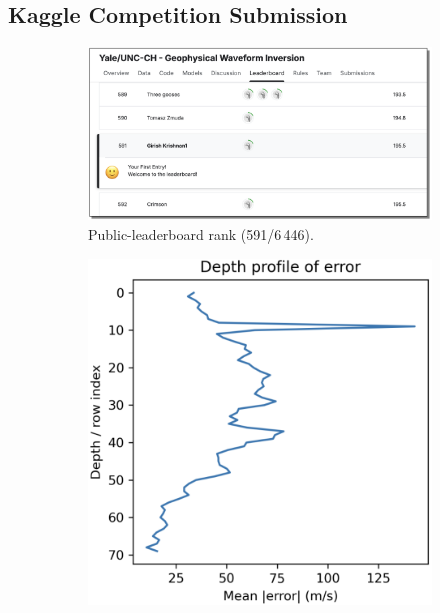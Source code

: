 \documentclass{article}
\begin{document}
\subsection{Kaggle Competition Submission}


\begin{figure}[t]
    \centering
    \begin{subfigure}[b]{0.32\linewidth}
        \centering
        \includegraphics[width=\linewidth]{figures/kaggle_rank.png}
        \caption{Public-leaderboard rank (591/6\,446).}
        \label{fig:kaggle_submission}
    \end{subfigure}
    \hfill
    \begin{subfigure}[b]{0.32\linewidth}
        \centering
        \includegraphics[width=\linewidth]{figures/fdonet_error_depth.png}

\end{subfigure}
\end{figure}
\end{document}
